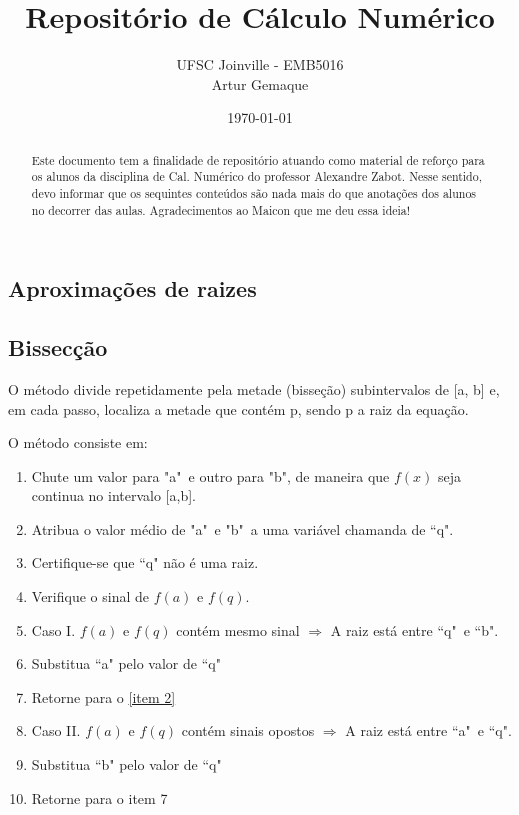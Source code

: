 \documentclass{article}
\title{\textbf{Repositório de Cálculo Numérico}}
\author{UFSC Joinville - EMB5016 \\ Artur Gemaque}
\date{\today}
\begin{document}
\maketitle

\begin{abstract}
    Este documento tem a finalidade de repositório atuando como material de reforço 
    para os alunos da disciplina de Cal. Numérico do professor Alexandre Zabot. Nesse sentido, 
    devo informar que os sequintes conteúdos são nada mais do que anotações 
    dos alunos no decorrer das aulas. Agradecimentos ao Maicon que me deu essa ideia!
\end{abstract}

\begin{multicols}{2}

\section{Aproximações de raizes}
    \subsection{Bissecção}
        O método divide repetidamente pela metade (bisseção) subintervalos de [a, b] e, em cada
        passo, localiza a metade que contém p, sendo p a raiz da equação.

        O método consiste em: 
        \begin{enumerate}
            \item Chute um valor para "a"\ e outro para "b", de maneira que $ f(x) $ seja continua no intervalo [a,b].
            \item Atribua o valor médio de "a"\ e "b"\ a uma variável chamanda de ``q". \label{item 2}
            \item Certifique-se que ``q" não é uma raiz.
            \item Verifique o sinal de $ f(a) $ e $ f(q) $.
            \item Caso I. $ f(a) $ e $ f(q) $ contém mesmo sinal $\Longrightarrow $ A raiz está entre ``q"\ e ``b". 
            \item Substitua ``a" pelo valor de ``q"
            \item Retorne para o \ref{item 2}
            \item Caso II. \(f(a)\) e $ f(q) $ contém sinais opostos $\Longrightarrow $ A raiz está entre ``a"\ e ``q". 
            \item Substitua ``b" pelo valor de ``q"
            \item Retorne para o item 7
        \end{enumerate}


\end{multicols}
\end{document}

